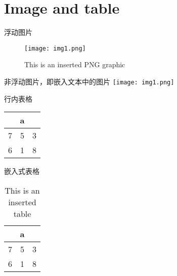 \section{Image and table}
\begin{frame}{\secname}
    浮动图片
    \begin{figure} 
        \centering
        \texttt{[image: img1.png]}
        \caption{This is an inserted PNG graphic}
        \label{img:1}
    \end{figure}
\end{frame}

\begin{frame}{\secname}
    非浮动图片，即嵌入文本中的图片
    \texttt{[image: img1.png]}
\end{frame}
\begin{frame}{\secname}
    行内表格
    \begin{tabular}{c|c|c}
        \hline \multicolumn{3}{c}{a}\\
        \hline 7&5&3\\
        \hline 6&1&8\\
        \hline
    \end{tabular}
        
    嵌入式表格
    \begin{table}[]
        \centering
        \caption{This is an inserted table}
        \label{tbl:1}
        \begin{tabular}{c|c|c}
            \hline \multicolumn{3}{c}{a}\\
            \hline 7&5&3\\
            \hline 6&1&8\\
            \hline
        \end{tabular}
    \end{table}
    
\end{frame}